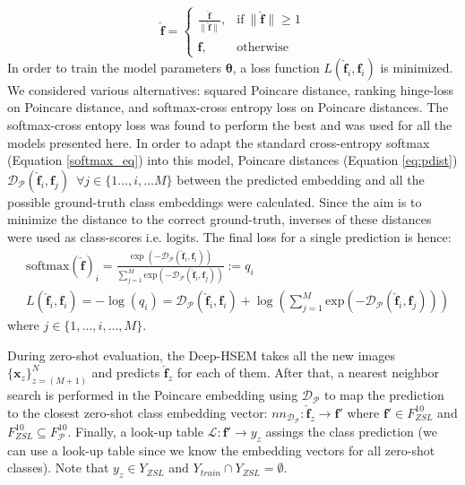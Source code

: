 \documentclass[12pt]{report}
\begin{document}
\begin{equation}
\mathbf{\hat{f}} =
\begin{cases}
   \frac{\mathbf{\hat{f}}}{\lVert\mathbf{\hat{f}}\rVert}, & \text{if}\ \lVert\mathbf{\hat{f}}\rVert \geq 1 \\
   \mathbf{\hat{f}}, & \text{otherwise} 
\end{cases}
\end{equation}
In order to train the model parameters $\pmb{\theta}$, a loss function $L(\mathbf{\hat{f}}_i, \mathbf{f}_i)$ is minimized. We considered various alternatives: squared Poincare distance, ranking hinge-loss on Poincare distance, and softmax-cross entropy loss on Poincare distances. The softmax-cross entopy loss was found to perform the best and was used for all the models presented here. In order to adapt the standard cross-entropy softmax (Equation \ref{softmax_eq}) into this model, Poincare distances (Equation \ref{eq:pdist}) $\mathcal{D_{\mathcal{P}}}(\mathbf{\hat{f}}_i, \mathbf{f}_j) \,\,\, \forall j \in \{1\dots,i,\dots M\}$  between the predicted embedding and all the possible ground-truth class embeddings were calculated. Since the aim is to minimize the distance to the correct ground-truth, inverses of these distances were used as class-scores i.e. logits. The final loss for a single prediction is hence:
\begin{align} \label{softmax_eq_poinc}
& \text{softmax}(\mathbf{\hat{f}})_i = \frac{\exp (-\mathcal{D_{\mathcal{P}}}(\mathbf{\hat{f}}_i, \mathbf{f}_i))}{\sum_{j=1}^M \text{exp}(-\mathcal{D_{\mathcal{P}}}(\mathbf{\hat{f}}_i, \mathbf{f}_j))} := q_i \\
& L(\mathbf{\hat{f}}_i, \mathbf{f}_i)  = -\log \left(q_i\right) = \mathcal{D_{\mathcal{P}}}(\mathbf{\hat{f}}_i, \mathbf{f}_i) + \log\left(\sum_{j=1}^M \text{exp}(-\mathcal{D_{\mathcal{P}}}(\mathbf{\hat{f}}_i, \mathbf{f}_j))\right)
\end{align}
where $j \in \{1,\dots,i,\dots,M\}$. 

During zero-shot evaluation, the Deep-HSEM takes all the new images $\{\mathbf{x}_z\}_{z=(M+1)}^N$ and predicts $\mathbf{\hat{f}}_z$ for each of them. After that, a nearest neighbor search is performed in the Poincare embedding using $\mathcal{D_{\mathcal{P}}}$ to map the prediction to the closest zero-shot class embedding vector: $nn_{\mathcal{D}_{\mathcal{P}}}: \mathbf{\hat{f}}_z \rightarrow \mathbf{f'}$ where $\mathbf{f'} \in F_{ZSL}^{10}$ and $F_{ZSL}^{10} \subseteq F_{\mathcal{P}}^{10}$. Finally, a look-up table $\mathcal{L}: \mathbf{f'} \rightarrow y_{z}$ assings the class prediction (we can use a look-up table since we know the embedding vectors for all zero-shot classes). Note that $y_z \in Y_{ZSL}$ and $Y_{train}\cap Y_{ZSL}=\emptyset$.
\end{document}
